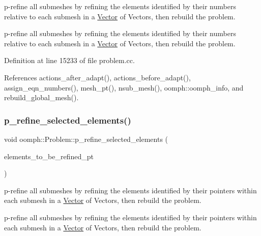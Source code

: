 p-\/refine all submeshes by refining the elements identified by their numbers relative to each submesh in a \hyperlink{classoomph_1_1Vector}{Vector} of Vectors, then rebuild the problem. 

p-\/refine all submeshes by refining the elements identified by their numbers relative to each submesh in a \hyperlink{classoomph_1_1Vector}{Vector} of Vectors, then rebuild the problem. 

Definition at line 15233 of file problem.\+cc.



References actions\+\_\+after\+\_\+adapt(), actions\+\_\+before\+\_\+adapt(), assign\+\_\+eqn\+\_\+numbers(), mesh\+\_\+pt(), nsub\+\_\+mesh(), oomph\+::oomph\+\_\+info, and rebuild\+\_\+global\+\_\+mesh().

\mbox{\label{classoomph_1_1Problem_acd99cf948f29c39e56b42d432b5c0c25}} 
\subsubsection{\texorpdfstring{p\+\_\+refine\+\_\+selected\+\_\+elements()}{p\_refine\_selected\_elements()}\hspace{0.1cm}{\footnotesize\ttfamily [6/6]}}
{\footnotesize\ttfamily void oomph\+::\+Problem\+::p\+\_\+refine\+\_\+selected\+\_\+elements (\begin{DoxyParamCaption}\item[{const \hyperlink{classoomph_1_1Vector}{Vector}$<$ \hyperlink{classoomph_1_1Vector}{Vector}$<$ \hyperlink{classoomph_1_1PRefineableElement}{P\+Refineable\+Element} $\ast$$>$ $>$ \&}]{elements\+\_\+to\+\_\+be\+\_\+refined\+\_\+pt }\end{DoxyParamCaption})}



p-\/refine all submeshes by refining the elements identified by their pointers within each submesh in a \hyperlink{classoomph_1_1Vector}{Vector} of Vectors, then rebuild the problem. 

p-\/refine all submeshes by refining the elements identified by their pointers within each submesh in a \hyperlink{classoomph_1_1Vector}{Vector} of Vectors, then rebuild the problem. 

